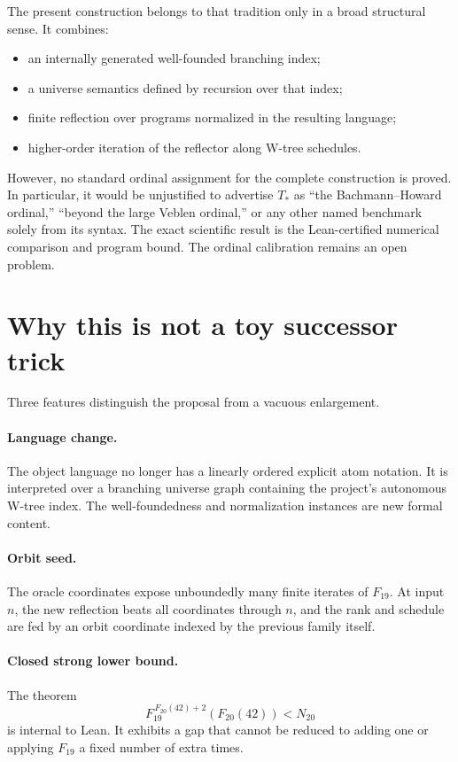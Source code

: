 \documentclass[11pt]{article}
\theoremstyle{definition}
\theoremstyle{remark}
\begin{document}
The present construction belongs to that tradition only in a broad structural
sense.  It combines:

\begin{itemize}[leftmargin=2.2em]
\item an internally generated well-founded branching index;
\item a universe semantics defined by recursion over that index;
\item finite reflection over programs normalized in the resulting language;
\item higher-order iteration of the reflector along W-tree schedules.
\end{itemize}

However, no standard ordinal assignment for the complete construction is
proved.  In particular, it would be unjustified to advertise $T_{\!*}$ as
``the Bachmann--Howard ordinal,'' ``beyond the large Veblen ordinal,'' or any
other named benchmark solely from its syntax.  The exact scientific result is
the Lean-certified numerical comparison and program bound.  The ordinal
calibration remains an open problem.

\section{Why this is not a toy successor trick}

Three features distinguish the proposal from a vacuous enlargement.

\paragraph{Language change.}
The object language no longer has a linearly ordered explicit atom notation.
It is interpreted over a branching universe graph containing the project's
autonomous W-tree index.  The well-foundedness and normalization instances are
new formal content.

\paragraph{Orbit seed.}
The oracle coordinates expose unboundedly many finite iterates of $F_{19}$.
At input $n$, the new reflection beats all coordinates through $n$, and the
rank and schedule are fed by an orbit coordinate indexed by the previous
family itself.

\paragraph{Closed strong lower bound.}
The theorem
\[
  F_{19}^{\,F_{20}(42)+2}(F_{20}(42))<N_{20}
\]
is internal to Lean.  It exhibits a gap that cannot be reduced to adding one
or applying $F_{19}$ a fixed number of extra times.
\end{document}
